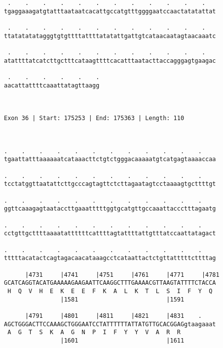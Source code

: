 \documentclass{article}
\begin{document}
\begin{Verbatim}
 .    .    .    .    .    .    .    .    .    .    .    .   
tgaggaaagatgtatttaataatcacattgccatgtttggggaatccaactatatattat
                                                            
 .    .    .    .    .    .    .    .    .    .    .    .   
ttatatatatagggtgtgttttattttatatattgattgtcataacaatagtaacaaatc
                                                            
 .    .    .    .    .    .    .    .    .    .    .    .   
atattttatcatcttgctttcataagttttcacatttaatacttaccagggagtgaagac
                                                            
 .    .    .    .    .    .
aacattattttcaaattatagttaagg
                           
                           
 
Exon 36 | Start: 175253 | End: 175363 | Length: 110



.    .    .    .    .    .    .    .    .    .    .    .    
tgaattatttaaaaaatcataaacttctgtctgggacaaaaatgtcatgagtaaaaccaa
                                                            
.    .    .    .    .    .    .    .    .    .    .    .    
tcctatggttaatattcttgcccagtagttctcttagaatagtcctaaaagtgcttttgt
                                                            
.    .    .    .    .    .    .    .    .    .    .    .    
ggttcaaagagtaataccttgaaatttttggtgcatgttgccaaattaccctttagaatg
                                                            
.    .    .    .    .    .    .    .    .    .    .    .    
cctgttgcttttaaaatattttttcattttagtattttattgtttatccaattatagact
                                                            
.    .    .    .    .    .    .    .    .    .    .    .    
tttttacatactcagtagacaacataaagcctcataattactctgttatttttcttttag
                                                            
      |4731     |4741     |4751     |4761     |4771     |4781
GCATCAGGTACATGAAAAAGAAGAATTCAAGGCTTTGAAAACGTTAAGTATTTTCTACCA
 H  Q  V  H  E  K  E  E  F  K  A  L  K  T  L  S  I  F  Y  Q 
                |1581                         |1591         
  
      |4791     |4801     |4811     |4821     |4831    .    
AGCTGGGACTTCCAAAGCTGGGAATCCTATTTTTTATTATGTTGCACGGAGgtaagaaat
 A  G  T  S  K  A  G  N  P  I  F  Y  Y  V  A  R  R          
                |1601                         |1611         
  

\end{Verbatim}
\end{document}
